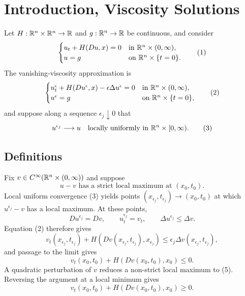 
\section{Introduction, Viscosity Solutions}
\label{sec:hj-introduction-viscosity-solutions}

Let $H:\mathbb{R}^n\times\mathbb{R}^n\to\mathbb{R}$ and $g:\mathbb{R}^n\to\mathbb{R}$ be continuous, and consider
\[
\begin{cases}
u_t+H(Du,x)=0 & \text{in }\mathbb{R}^n\times(0,\infty),\\
u=g & \text{on }\mathbb{R}^n\times\{t=0\}.
\end{cases}
\tag{1}
\]
The vanishing-viscosity approximation is
\[
\begin{cases}
u_t^\epsilon+H(Du^\epsilon,x)-\epsilon\Delta u^\epsilon=0
& \text{in }\mathbb{R}^n\times(0,\infty),\\
u^\epsilon=g & \text{on }\mathbb{R}^n\times\{t=0\},
\end{cases}
\tag{2}
\]
and suppose along a sequence $\epsilon_j\downarrow0$ that
\[
u^{\epsilon_j}\longrightarrow u
\quad\text{locally uniformly in }\mathbb{R}^n\times[0,\infty).
\tag{3}
\]

\subsection{Definitions}

\begin{remark}
\label{rem:hj-viscosity-solution-motivation}
Fix $v\in C^\infty(\mathbb{R}^n\times(0,\infty))$ and suppose
\[
u-v\text{ has a strict local maximum at }(x_0,t_0).
\tag{5}
\]
Local uniform convergence (3) yields points $(x_{\epsilon_j},t_{\epsilon_j})\to(x_0,t_0)$ at which $u^{\epsilon_j}-v$ has a local maximum. At these points,
\[
Du^{\epsilon_j}=Dv,
\qquad
u_t^{\epsilon_j}=v_t,
\qquad
\Delta u^{\epsilon_j}\leq\Delta v.
\]
Equation (2) therefore gives
\[
v_t(x_{\epsilon_j},t_{\epsilon_j})
+H(Dv(x_{\epsilon_j},t_{\epsilon_j}),x_{\epsilon_j})
\leq\epsilon_j\Delta v(x_{\epsilon_j},t_{\epsilon_j}),
\tag{11}
\]
and passage to the limit gives
\[
v_t(x_0,t_0)+H(Dv(x_0,t_0),x_0)\leq0.
\tag{12}
\]
A quadratic perturbation of $v$ reduces a non-strict local maximum to (5). Reversing the argument at a local minimum gives
\[
v_t(x_0,t_0)+H(Dv(x_0,t_0),x_0)\geq0.
\tag{14}
\]
\end{remark}

